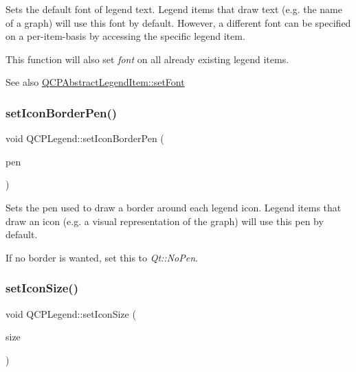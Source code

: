 Sets the default font of legend text. Legend items that draw text (e.\+g. the name of a graph) will use this font by default. However, a different font can be specified on a per-\/item-\/basis by accessing the specific legend item.

This function will also set {\itshape font} on all already existing legend items.

\begin{DoxySeeAlso}{See also}
\mbox{\hyperlink{class_q_c_p_abstract_legend_item_a409c53455d8112f71d70c0c43eb10265}{Q\+C\+P\+Abstract\+Legend\+Item\+::set\+Font}} 
\end{DoxySeeAlso}
\mbox{\label{class_q_c_p_legend_a2f2c93d18a651f4ff294bb3f026f49b8}} 
\subsubsection{\texorpdfstring{set\+Icon\+Border\+Pen()}{setIconBorderPen()}}
{\footnotesize\ttfamily void Q\+C\+P\+Legend\+::set\+Icon\+Border\+Pen (\begin{DoxyParamCaption}\item[{const Q\+Pen \&}]{pen }\end{DoxyParamCaption})}

Sets the pen used to draw a border around each legend icon. Legend items that draw an icon (e.\+g. a visual representation of the graph) will use this pen by default.

If no border is wanted, set this to {\itshape Qt\+::\+No\+Pen}. \mbox{\label{class_q_c_p_legend_a8b0740cce488bf7010da6beda6898984}} 
\subsubsection{\texorpdfstring{set\+Icon\+Size()}{setIconSize()}\hspace{0.1cm}{\footnotesize\ttfamily [1/2]}}
{\footnotesize\ttfamily void Q\+C\+P\+Legend\+::set\+Icon\+Size (\begin{DoxyParamCaption}\item[{const Q\+Size \&}]{size }\end{DoxyParamCaption})}

